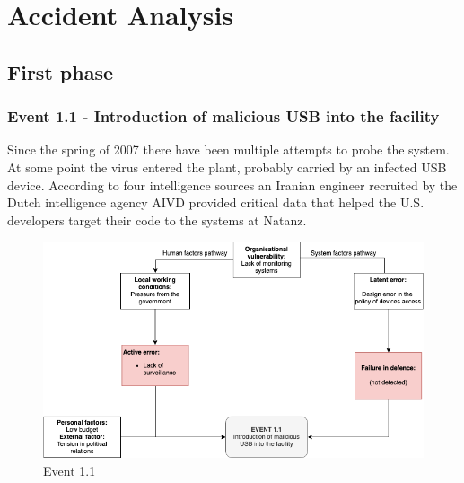 \documentclass[12pt]{article}
\begin{document}
\section{Accident Analysis}
    \subsection{First phase}
    \subsubsection{Event 1.1 - Introduction of malicious USB into the facility}
    Since the spring of 2007 there have been multiple attempts to probe the system. At some point the virus entered the plant, probably carried by an infected USB device. According to four intelligence sources an Iranian engineer recruited by the Dutch intelligence agency AIVD provided critical data that helped the U.S. developers target their code to the systems at Natanz.
    
        \begin{figure}[H]
        \centering
        \includegraphics[width=\textwidth]{event11.png}
        \caption{Event 1.1}
        \label{fig:event11}
        \end{figure}
        
\end{document}
